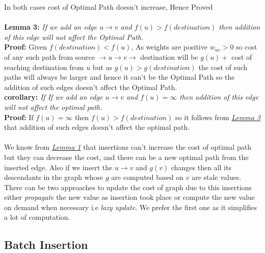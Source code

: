\documentclass[a4paper]{article}
\begin{document}
In both cases cost of Optimal Path doesn't increase, Hence Proved\\
\\
\hypertarget{Lemma 3}{\textbf{Lemma 3:}} \textit{If we add an edge $u \rightarrow v$ and $f(u) > f(destination)$ then addition of this edge will not affect the Optimal Path.}\\
\textbf{Proof:} Given  $f(destination) < f(u)$, As weights are positive $w_{uv} > 0$ so cost of any such path from source $\rightarrow u \rightarrow v \rightarrow$ destination will be $g(u) + $ cost of reaching destination from $u$ but as $g(u) > g(destination)$ the cost of such paths will always be larger and hence it can't be the Optimal Path so the addition of such edges doesn't affect the Optimal Path.\\   
\textbf{corollary:} \textit{If If we add an edge $u \rightarrow v$ and $f(u) = \infty$ then addition of this edge will not affect the optimal path.}\\
\textbf{Proof:} If $f(u) = \infty$ then $f(u) > f(destination)$ so it follows from \hyperlink{Lemma 3}{\textit{Lemma 3}}  that addition of such edges doesn't affect the optimal path.\\
\\
We know from \hyperlink{Lemma 1}{\textit{Lemma 1}} that insertions can't increase the cost of optimal path but they can decrease the cost, and there can be a new optimal path from the inserted edge. Also if we insert the $u \rightarrow v$ and $g(v)$ changes then all its descendants in the graph whose $g$ are computed based on $v$ are stale values. There can be two approaches to update the cost of graph due to this insertions either \textit{propagate} the new value as insertion took place or compute the new value on demand when necessary i.e \textit{lazy update}. We prefer the first one as it simplifies a lot of computation.\\

\subsection{Batch Insertion}
\end{document}

